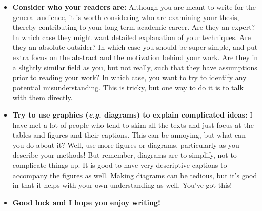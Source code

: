 \begin{itemize}
    \item \textbf{Consider who your readers are:} Although you are meant to write for the general audience, it is worth considering who are examining your thesis, thereby contributing to your long term academic career. Are they an expert? In which case they might want detailed explanation of your techniques. Are they an absolute outsider? In which case you should be super simple, and put extra focus on the abstract and the motivation behind your work. Are they in a slightly similar field as you, but not really, such that they have assumptions prior to reading your work? In which case, you want to try to identify any potential misunderstanding. This is tricky, but one way to do it is to talk with them directly.  
    \item \textbf{Try to use graphics (\textit{e.g.} diagrams) to explain complicated ideas:} I have met a lot of people who tend to skim all the texts and just focus at the tables and figures and their captions. This can be annoying, but what can you do about it? Well, use more figures or diagrams, particularly as you describe your methods! But remember, diagrams are to simplify, not to complicate things up. It is good to have very descriptive captions to accompany the figures as well. Making diagrams can be tedious, but it's good in that it helps with your own understanding as well. You've got this!
    \item \textbf{Good luck and I hope you enjoy writing!}
\end{itemize}